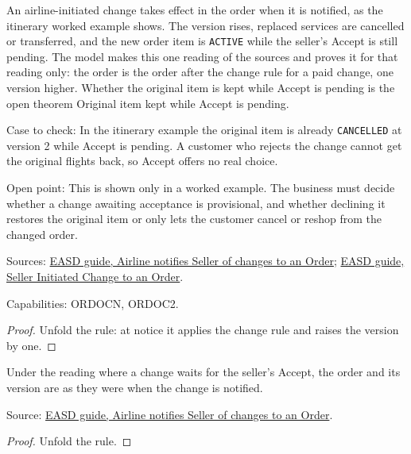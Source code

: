 \begin{theorem}
  \label{thm:airline-change-applied-before-acceptance}
  An airline-initiated change takes effect in the order when it is notified,
  as the itinerary worked example shows.  The version rises, replaced
  services are cancelled or transferred, and the new order item is
  \texttt{ACTIVE} while the seller's Accept is still pending.  The model
  makes this one reading of the sources and proves it for that reading only:
  the order is the order after the change rule for a paid change, one
  version higher.  Whether the original item is kept while Accept is pending
  is the open theorem Original item kept while Accept is pending.

  Case to check: In the itinerary example the original item is already
  \texttt{CANCELLED} at version 2 while Accept is pending. A customer who
  rejects the change cannot get the original flights back, so Accept offers
  no real choice.

  Open point: This is shown only in a worked example. The business must
  decide whether a change awaiting acceptance is provisional, and whether
  declining it restores the original item or only lets the customer cancel
  or reshop from the changed order.

  Sources: \href{https://standards.atlassian.net/wiki/spaces/EASD/pages/815202352}{EASD guide, Airline notifies Seller of changes to an Order};
  \href{https://standards.atlassian.net/wiki/spaces/EASD/pages/574554168}{EASD guide, Seller Initiated Change to an Order}.

  Capabilities: ORDOCN, ORDOC2.
\end{theorem}
\begin{proof}
  Unfold the rule: at notice it applies the change rule and raises the
  version by one.
\end{proof}

\begin{theorem}
  \label{thm:airline-change-awaiting-accept}
  Under the reading where a change waits for the seller's Accept, the order
  and its version are as they were when the change is notified.

  Source: \href{https://standards.atlassian.net/wiki/spaces/EASD/pages/815202352}{EASD guide, Airline notifies Seller of changes to an Order}.
\end{theorem}
\begin{proof}
  Unfold the rule.
\end{proof}

